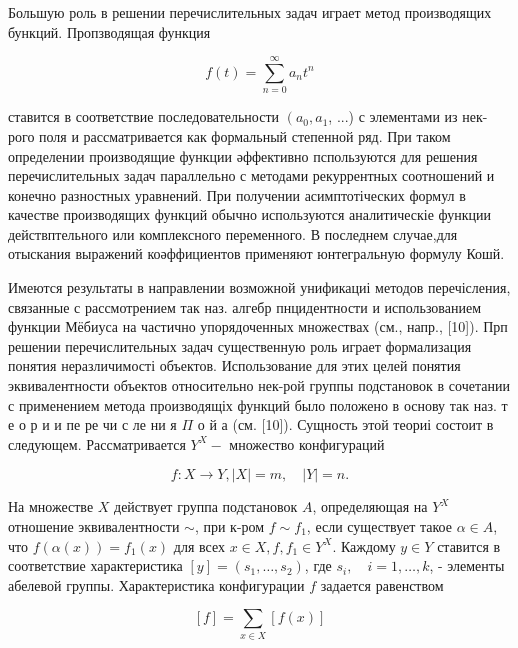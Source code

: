 \documentclass[10pt]{article}
\begin{document}
Большую роль в решении перечислительных задач играет метод производящих бункций. Пропзводящая функция



\[

f(t)=\sum_{n=0}^{\infty} a_{n} t^{n}

\]



ставится в соответствие последовательности $\left(a_{0}, a_{1}\right.$, ...) с элементами из нек-рого поля и рассматривается как формальный степенной ряд. При таком определении производящие функции әффективно пспользуются для решения перечислительных задач параллельно с методами рекуррентных соотношений и конечно разностных уравнений. При получении асимптотіческих формул в качестве производящих функций обычно используются аналитическіе функции действптельного или комплексного переменного. В последнем случае,для отыскания выражений коәффициентов применяют юнтегральную формулу Кошй.



Имеются результаты в направлении возможной унификациі методов перечісления, связанные с рассмотрением так наз. алгебр пнцидентности и использованием функции Мёбиуса на частично упорядоченных множествах (см., напр., [10]). Прп решении перечислительных задач существенную роль играет формализация понятия неразличимості объектов. Использование для этих целей понятия эквивалентности объектов относительно нек-рой группы подстановок в сочетании с применением метода производящіх функций было положено в основу так наз. т е о р и и пе ре чи с ле ни я $\Pi$ о й а (см. [10]). Сущность этой теориі состоит в следующем. Рассматривается $Y^{X}-$ множество конфигураций



\[

f: X \rightarrow Y,|X|=m, \quad|Y|=n .

\]



На множестве $X$ действует группа подстановок $A$, определяющая на $Y^{X}$ отношение эквивалентности $\sim$, при к-ром $f \sim f_{1}$, если существует такое $\alpha \in A$, что $f(\alpha(x))=f_{1}(x)$ для всех $x \in X, f, f_{1} \in Y^{X}$. Каждому $y \in Y$ ставится в соответствие характеристика $[y]=\left(s_{1}, \ldots, s_{2}\right)$, где $s_{i}, \quad i=1, \ldots, k$, - элементы абелевой группы. Характеристика конфигурации $f$ задается равенством



\[

[f]=\sum_{x \in X}[f(x)]

\]
\end{document}
